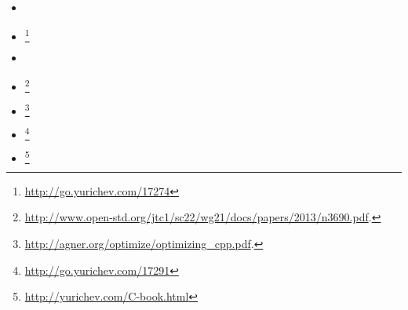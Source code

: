 \begin{itemize}

\item \KRBook

\item \CNineNineStd\footnote{\AlsoAvailableAs \url{http://go.yurichev.com/17274}}

\item \TCPPPL

\item \CppOneOneStd\footnote{\AlsoAvailableAs \url{http://www.open-std.org/jtc1/sc22/wg21/docs/papers/2013/n3690.pdf}.}

\item \AgnerFogCPP\footnote{\AlsoAvailableAs \url{http://agner.org/optimize/optimizing_cpp.pdf}.}

\item \ParashiftCPPFAQ\footnote{\AlsoAvailableAs \url{http://go.yurichev.com/17291}}

\item \CNotes\footnote{\AlsoAvailableAs \url{http://yurichev.com/C-book.html}}

\end{itemize}

